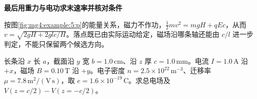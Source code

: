 \begin{solution}
\par\medskip{}\noindent\textbf{最后用重力与电功求末速率并核对条件}\par\nobreak
按图\ref{fig:mg4:example:5:p}的能量关系，磁力不作功，$\tfrac12mv^2=mgH+qEc$，从而 $v=\sqrt{2gH+2glc/H}$。落点既已由实际运动给定，磁场沿哪条轴还能由 $c/l$ 进一步判定，不能只保留两个候选方向。\end{solution}
\begin{question}\begin{example}[电子导体的总电场与霍尔电压]\label{mg4:example:6}
长条沿 $x$ 长 $a$，截面沿 $y$ 宽 $b=1.0\,\mathrm{cm}$、沿 $z$ 厚 $c=1.0\,\mathrm{mm}$。电流 $I=1.0\,\mathrm A$ 沿 $+x$，磁场 $B=0.10\,\mathrm T$ 沿 $+y$。电子密度 $n=2.5\times10^{22}\,\mathrm{m^{-3}}$、迁移率 $\mu=7.8\,\mathrm{m^2/(V\,s)}$，取 $e=1.6\times10^{-19}\,\mathrm C$。求总电场及 $V(z=c/2)-V(z=-c/2)$。
\end{example}
\end{question}
